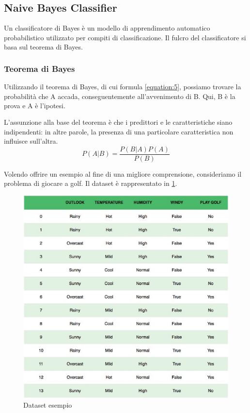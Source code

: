 \subsection{Naive Bayes Classifier}
\cite{NaiveBayesClassTowardDataScience}
Un classificatore di Bayes è un modello di apprendimento automatico probabilistico utilizzato per compiti di classificazione. Il fulcro del classificatore si basa sul teorema di Bayes.


\subsubsection{Teorema di Bayes}
Utilizzando il teorema di Bayes, di cui formula \ref{equation:5}, possiamo trovare la probabilità che A accada, conseguentemente all’avvenimento di B. Qui, B è la prova e A è l'ipotesi. 

L'assunzione alla base del teorema è che i predittori e le caratteristiche siano indipendenti: in altre parole, la presenza di una particolare caratteristica non influisce sull'altra.
\begin{equation}
    P(A|B) = \frac{P(B|A)P(A)}{P(B)}
    \label{equation:5}
\end{equation}

Volendo oﬀrire un esempio al fine di una migliore comprensione, consideriamo il problema di giocare a golf.  Il dataset è rappresentato in \ref{fig:image13}.
\begin{figure}
    \begin{center}    
        \includegraphics[width=0.7\linewidth]{images/image18.jpeg}
        \caption{Dataset esempio}
        \label{fig:image13}
    \end{center}
\end{figure}

